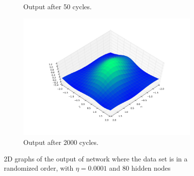 \documentclass[a4paper,10pt]{article}
\numberwithin{equation}{section} %
\numberwithin{figure}{section} %
\numberwithin{table}{section} %
\theoremstyle{mytheor}
\begin{document}
\begin{enumerate}
\begin{figure}[h!]
\begin{subfigure}[b]{0.45\textwidth}
				\caption{Output after 50 cycles.}
			\end{subfigure}
			\begin{subfigure}[b]{0.45\textwidth}
				\includegraphics[width=\textwidth]{plot/ex2_6_alt2000.png}\vspace{-0.5cm}
				\caption{Output after 2000 cycles.}
			\end{subfigure}
   			\caption{\vspace{-0.1cm} 2D graphs of the output of network where the data set is in a randomized order, with $\eta = 0.0001$ and 80 hidden nodes}\vspace{-0.2cm}
  		\end{figure}
		
\end{enumerate}

\end{document}
